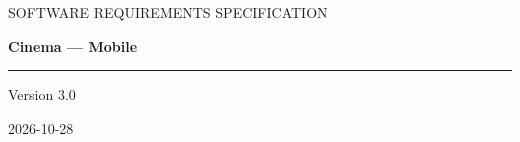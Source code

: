 \documentclass[11pt,a4paper,oneside]{article}
\begin{document}
\begin{titlepage}
\centering
\vspace*{32mm}
{\Large\sffamily\color{SRSlate}SOFTWARE REQUIREMENTS SPECIFICATION\par}
\vspace{14mm}
{\Huge\bfseries\color{SRSlate}Cinema — Mobile\par}
\vspace{12mm}
{\color{SRSRule}\rule{.72\textwidth}{.7pt}\par}
\vfill
{\large Version 3.0\par}
\vspace{4mm}
{\large 2026-10-28\par}
\vspace{20mm}
\end{titlepage}


\clearpage
\tableofcontents
\clearpage
\listoftables
\clearpage
{}




























\end{document}
